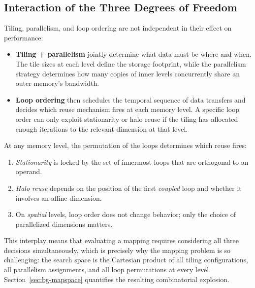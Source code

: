 \subsection{Interaction of the Three Degrees of Freedom}
\label{sec:dof-interaction}

Tiling, parallelism, and loop ordering are not independent in their
effect on performance:

\begin{itemize}
  \item \textbf{Tiling + parallelism} jointly determine what data must
    be where and when.
    The tile sizes at each level define the storage footprint, while the
    parallelism strategy determines how many copies of inner levels
    concurrently share an outer memory's bandwidth.

  \item \textbf{Loop ordering} then schedules the temporal sequence of
    data transfers and decides which reuse mechanism fires at each
    memory level.
    A specific loop order can only exploit stationarity or halo reuse
    if the tiling has allocated enough iterations to the relevant
    dimension at that level.
\end{itemize}

At any memory level, the permutation of the loops determines which
reuse fires:
\begin{enumerate}
  \item \emph{Stationarity} is locked by the set of innermost loops
    that are orthogonal to an operand.
  \item \emph{Halo reuse} depends on the position of the first
    \emph{coupled} loop and whether it involves an affine dimension.
  \item On \emph{spatial} levels, loop order does not change behavior;
    only the choice of parallelized dimensions matters.
\end{enumerate}

\noindent
This interplay means that evaluating a mapping requires considering all
three decisions simultaneously, which is precisely why the mapping
problem is so challenging:
the search space is the Cartesian product of all tiling configurations,
all parallelism assignments, and all loop permutations at every level.
Section~\ref{sec:bg-mapspace} quantifies the resulting combinatorial
explosion.

